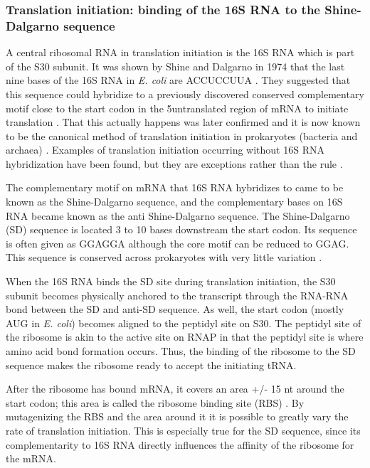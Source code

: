 \subsubsection{Translation initiation: binding of the 16S RNA to the
Shine-Dalgarno sequence} A central ribosomal RNA in translation initiation is
the 16S RNA which is part of the S30 subunit. It was shown by Shine and
Dalgarno in 1974 that the last nine bases of the 16S RNA in \textit{E. coli}
are ACCUCCUUA \cite{shine_3-terminal_1974}. They suggested that this sequence
could hybridize to a previously discovered conserved complementary motif close
to the start codon in the 5\p untranslated region of mRNA to initiate
translation \cite{shine_3-terminal_1974}. That this actually happens was later
confirmed and it is now known to be the canonical method of translation
initiation in prokaryotes (bacteria and archaea) \cite{nakagawa_dynamic_2010}.
Examples of translation initiation occurring without 16S RNA hybridization have
been found, but they are exceptions rather than the rule
\cite{skorski_highly_2006, boni_non-canonical_2001}.

The complementary motif on mRNA that 16S RNA hybridizes to came to be known as
the Shine-Dalgarno sequence, and the complementary bases on 16S RNA became
known as the anti Shine-Dalgarno sequence. The Shine-Dalgarno (SD) sequence is
located 3 to 10 bases downstream the start codon. Its sequence is often given
as GGAGGA although the core motif can be reduced to GGAG. This sequence is
conserved across prokaryotes with very little variation
\cite{nakagawa_dynamic_2010}. 

When the 16S RNA binds the SD site during translation initiation, the S30
subunit becomes physically anchored to the transcript through the RNA-RNA bond
between the SD and anti-SD sequence. As well, the start codon (mostly AUG in
\textit{E. coli}) becomes aligned to the peptidyl site on S30. The peptidyl
site of the ribosome is akin to the active site on RNAP in that the peptidyl
site is where amino acid bond formation occurs. Thus, the binding of the
ribosome to the SD sequence makes the ribosome ready to accept the initiating
tRNA.

After the ribosome has bound mRNA, it covers an area +/- 15 nt around the start
codon; this area is called the ribosome binding site (RBS)
\cite{kozak_regulation_2005}. By mutagenizing the RBS and the area around it it
is possible to greatly vary the rate of translation initiation. This is
especially true for the SD sequence, since its complementarity to 16S RNA
directly influences the affinity of the ribosome for the mRNA.

